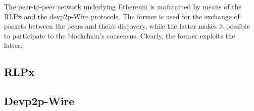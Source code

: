 
The peer-to-peer network underlying Ethereum is maintained by means of the 
RLPx and the devp2p-Wire protocols.
The former is used for the exchange of packets between the peers and theirs
discovery, while the latter makes it possible to participate to the 
blockchain's consensus. Clearly, the former exploits the latter.

\subsection{RLPx}



\subsection{Devp2p-Wire}

